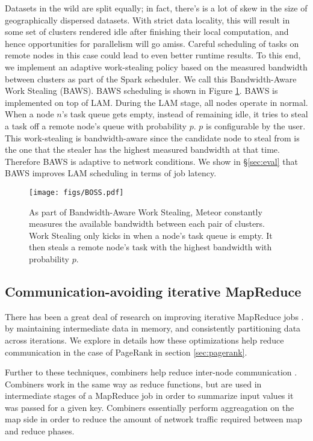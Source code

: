 Datasets in the wild are split equally; in fact, there's is a lot of skew in the size of geographically dispersed datasets.  With strict data locality, this will result in some set of clusters rendered idle after finishing their local computation, and hence opportunities for parallelism will go amiss.  Careful scheduling of tasks on remote nodes in this case could lead to even better runtime results. To this end, we implement an adaptive work-stealing policy based on the measured bandwidth between clusters as part of the Spark scheduler. We call this Bandwidth-Aware Work Stealing (BAWS). BAWS scheduling is shown in Figure \ref{fig:baws}. BAWS is implemented on top of LAM. During the LAM stage, all nodes operate in normal. When a node $n$'s task queue gets empty,
instead of remaining idle, it tries to steal a task off a remote node's queue with probability $p$. $p$ is configurable by the user. This work-stealing is bandwidth-aware since the candidate node to steal from is the one that the stealer has the highest measured bandwidth at that time. Therefore BAWS is adaptive to network conditions. 
We show in \S \ref{sec:eval}  that BAWS improves LAM scheduling in terms of job latency.

\begin{figure}[!ht]
\centering\texttt{[image: figs/BOSS.pdf]}
\vspace{-1.2em}
\caption{As part of Bandwidth-Aware Work Stealing, Meteor constantly measures the available bandwidth between each pair of clusters. Work Stealing only kicks in when a node's task queue is empty. It then steals a remote node's task with the highest bandwidth with probability $p$. }
\label{fig:baws}
\vspace{.7em}
\end{figure}

\subsection{Communication-avoiding iterative MapReduce}

There has been a great deal of research on improving iterative MapReduce jobs \cite{haloop, twister, rdd}. by maintaining intermediate data in memory, and consistently partitioning data across iterations. We explore in details how these optimizations help reduce communication in the case of PageRank in section \ref{sec:pagerank}.

Further to these techniques, combiners help reduce inter-node communication \cite{hop}. Combiners work in the same way as reduce functions, but are used in intermediate stages of a MapReduce job in order to summarize input values it was passed for a given key. Combiners essentially perform aggreagation on the map side in order to reduce the amount of network traffic required between map and reduce phases.  

